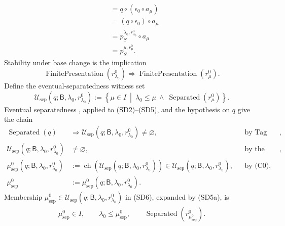 \begin{definition}
\[\begin{aligned}
      &=q\circ(\epsilon_0\circ a_\mu)\\
      &=(q\circ\epsilon_0)\circ a_\mu\\
      &=p_S^{\lambda_0,r_{\lambda_0}^0}\circ a_\mu\\
      &=p_S^{\mu,r_\mu^0}.
  \end{aligned}                                                     \tag{SD4}
  \]
  Stability under base change is the implication
  \[
    \operatorname{FinitePresentation}(r_{\lambda_0}^0)
      \Longrightarrow
    \operatorname{FinitePresentation}(r_\mu^0).                   \tag{SD5}
  \]
  Define the eventual-separatedness witness set
  \[
    \mathscr U_{\mathrm{sep}}
      (q;\mathsf B,\lambda_0,r_{\lambda_0}^0)
      :=\left\{
        \mu\in I\ \middle|\
        \lambda_0\leq\mu\ \wedge\
        \operatorname{Separated}(r_\mu^0)
      \right\}.
                                                                    \tag{SD5a}
  \]
  Eventual separatedness
  \cite[\href{https://stacks.math.columbia.edu/tag/01ZQ}{Tag 01ZQ}]
       {stacks-project}, applied to (SD2)--(SD5), and the hypothesis on $q$
  give the chain
  \[
  \begin{aligned}
    \operatorname{Separated}(q)
      &\Longrightarrow
      \mathscr U_{\mathrm{sep}}
        (q;\mathsf B,\lambda_0,r_{\lambda_0}^0)\neq\varnothing,
      &&\text{by Tag 01ZQ},\\
    \mathscr U_{\mathrm{sep}}
        (q;\mathsf B,\lambda_0,r_{\lambda_0}^0)
      &\neq\varnothing,
      &&\text{by the first line and the hypothesis},\\
    \mu_{\mathrm{sep}}^0
        (q;\mathsf B,\lambda_0,r_{\lambda_0}^0)
      &:=\operatorname{ch}\!\left(
        \mathscr U_{\mathrm{sep}}
          (q;\mathsf B,\lambda_0,r_{\lambda_0}^0)
        \right)
      \in
        \mathscr U_{\mathrm{sep}}
          (q;\mathsf B,\lambda_0,r_{\lambda_0}^0),
      &&\text{by (C0)},\\
    \mu_{\mathrm{sep}}^0
      &:=\mu_{\mathrm{sep}}^0
        (q;\mathsf B,\lambda_0,r_{\lambda_0}^0).
  \end{aligned}                                                     \tag{SD6}
  \]
  Membership
  \(\mu_{\mathrm{sep}}^0\in
    \mathscr U_{\mathrm{sep}}
      (q;\mathsf B,\lambda_0,r_{\lambda_0}^0)\)
  in (SD6), expanded by (SD5a), is
  \[
  \begin{gathered}
    \mu_{\mathrm{sep}}^0\in I,\qquad
    \lambda_0\leq\mu_{\mathrm{sep}}^0,\qquad
    \operatorname{Separated}(r_{\mu_{\mathrm{sep}}^0}^0).
  \end{gathered}
\]
\end{definition}

